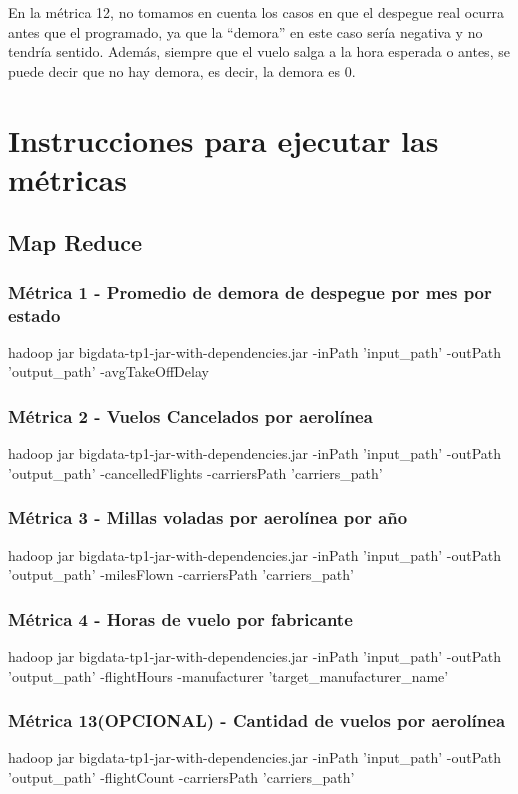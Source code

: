 \documentclass[a4paper,10pt]{article}
\begin{document}
En la métrica 12, no tomamos en cuenta los casos en que el despegue real ocurra antes que el programado, ya que la “demora” en este caso sería negativa y no tendría sentido. Además, siempre que el vuelo salga a la hora esperada o antes, se puede decir que no hay demora, es decir, la demora es 0.



\section{Instrucciones para ejecutar las métricas}

    \subsection{Map Reduce}
        \subsubsection{Métrica 1 - Promedio de demora de despegue por mes por estado}
            \footnotesize{hadoop jar bigdata-tp1-jar-with-dependencies.jar -inPath 'input\_path' -outPath 'output\_path' -avgTakeOffDelay}
        \subsubsection{Métrica 2 - Vuelos Cancelados por aerolínea}
            \footnotesize{hadoop jar bigdata-tp1-jar-with-dependencies.jar -inPath 'input\_path' -outPath 'output\_path' -cancelledFlights -carriersPath 'carriers\_path'}
        \subsubsection{Métrica 3 - Millas voladas por aerolínea por año}
            \footnotesize{hadoop jar bigdata-tp1-jar-with-dependencies.jar -inPath 'input\_path' -outPath 'output\_path' -milesFlown -carriersPath 'carriers\_path'}
        \subsubsection{Métrica 4 - Horas de vuelo por fabricante}
            \footnotesize{hadoop jar bigdata-tp1-jar-with-dependencies.jar -inPath 'input\_path' -outPath 'output\_path' -flightHours -manufacturer 'target\_manufacturer\_name'}
       \subsubsection{Métrica 13(OPCIONAL) - Cantidad de vuelos por aerolínea}
            \footnotesize{hadoop jar bigdata-tp1-jar-with-dependencies.jar -inPath 'input\_path' -outPath 'output\_path' -flightCount -carriersPath 'carriers\_path'}
\end{document}
